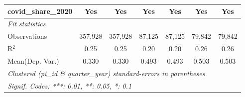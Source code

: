 \begin{tabular}{lcccccc}
   covid\_share\_2020                                          & Yes           & Yes           & Yes           & Yes           & Yes           & Yes\\  
   \midrule
   \emph{Fit statistics}\\
   Observations                                                & 357,928       & 357,928       & 87,125        & 87,125        & 79,842        & 79,842\\  
   R$^2$                                                       & 0.25          & 0.25          & 0.20          & 0.20          & 0.26          & 0.26\\  
Mean(Dep. Var.) & 0.330 & 0.330 & 0.493 & 0.493 & 0.503 & 0.503 \\
   \midrule \midrule
   \multicolumn{7}{l}{\emph{Clustered (pi\_id \& quarter\_year) standard-errors in parentheses}}\\
   \multicolumn{7}{l}{\emph{Signif. Codes: ***: 0.01, **: 0.05, *: 0.1}}\\
\end{tabular}
\par\endgroup
